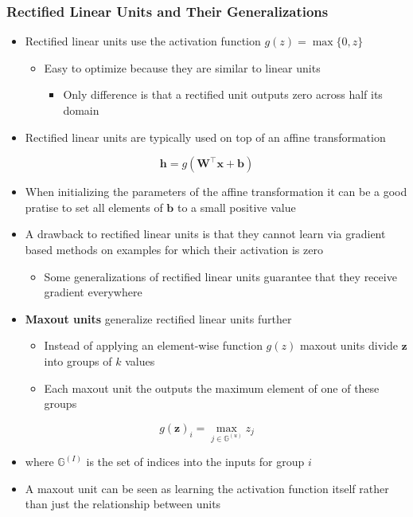 \documentclass[11pt]{article}
\begin{document}
\subsubsection{Rectiﬁed Linear Units and Their Generalizations}
\label{sec:org75dc01b}
\begin{itemize}
\item Rectified linear units use the activation function \(g(z) = \max\{0,z\}\)
\begin{itemize}
\item Easy to optimize because they are similar to linear units
\begin{itemize}
\item Only difference is that a rectified unit outputs zero across half its domain
\end{itemize}
\end{itemize}

\item Rectified linear units are typically used on top of an affine transformation
\end{itemize}
\begin{equation}
  \pmb h = g(\pmb W^\top \pmb x + \pmb b)
\end{equation}
\begin{itemize}
\item When initializing the parameters of the affine transformation it can be a good pratise to set all elements of \(\pmb b\) to a small positive value
\item A drawback to rectified linear units is that they cannot learn via gradient based methods on examples for which their activation is zero
\begin{itemize}
\item Some generalizations of rectified linear units guarantee that they receive gradient everywhere
\end{itemize}

\item \textbf{Maxout units} generalize rectified linear units further
\begin{itemize}
\item Instead of applying an element-wise function \(g(z)\) maxout units divide \(\pmb z\) into groups of \(k\) values
\item Each maxout unit the outputs the maximum element of one of these groups
\end{itemize}
\end{itemize}
\begin{equation}
  g(\pmb z)_i = \max_{j\in \mathbb G^{(u)}} z_j
\end{equation}
\begin{itemize}
\item where \(\mathbb G^{(I)}\) is the set of indices into the inputs for group \(i\)

\item A maxout unit can be seen as learning the activation function itself rather than just the relationship between units
\end{itemize}
\end{document}
